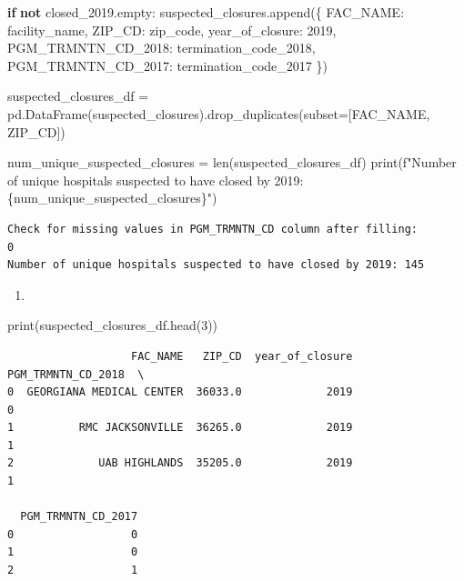 \documentclass[
  letterpaper,
  DIV=11,
  numbers=noendperiod]{scrartcl}
\newenvironment{Shaded}{\begin{snugshade}}{\end{snugshade}}
\newcommand{\BuiltInTok}[1]{\textcolor[rgb]{0.00,0.23,0.31}{#1}}
\newcommand{\ControlFlowTok}[1]{\textcolor[rgb]{0.00,0.23,0.31}{\textbf{#1}}}
\newcommand{\DecValTok}[1]{\textcolor[rgb]{0.68,0.00,0.00}{#1}}
\newcommand{\KeywordTok}[1]{\textcolor[rgb]{0.00,0.23,0.31}{\textbf{#1}}}
\newcommand{\NormalTok}[1]{\textcolor[rgb]{0.00,0.23,0.31}{#1}}
\newcommand{\OperatorTok}[1]{\textcolor[rgb]{0.37,0.37,0.37}{#1}}
\newcommand{\SpecialCharTok}[1]{\textcolor[rgb]{0.37,0.37,0.37}{#1}}
\newcommand{\SpecialStringTok}[1]{\textcolor[rgb]{0.13,0.47,0.30}{#1}}
\newcommand{\StringTok}[1]{\textcolor[rgb]{0.13,0.47,0.30}{#1}}
\providecommand{\tightlist}{%
  \setlength{\itemsep}{0pt}\setlength{\parskip}{0pt}}\usepackage{longtable,booktabs,array}
\begin{document}
\begin{Shaded}
\begin{Highlighting}[]
    \ControlFlowTok{if} \KeywordTok{not}\NormalTok{ closed\_2019.empty:}
\NormalTok{        suspected\_closures.append(\{}
            \StringTok{\textquotesingle{}FAC\_NAME\textquotesingle{}}\NormalTok{: facility\_name,}
            \StringTok{\textquotesingle{}ZIP\_CD\textquotesingle{}}\NormalTok{: zip\_code,}
            \StringTok{\textquotesingle{}year\_of\_closure\textquotesingle{}}\NormalTok{: }\DecValTok{2019}\NormalTok{,}
            \StringTok{\textquotesingle{}PGM\_TRMNTN\_CD\_2018\textquotesingle{}}\NormalTok{: termination\_code\_2018,}
            \StringTok{\textquotesingle{}PGM\_TRMNTN\_CD\_2017\textquotesingle{}}\NormalTok{: termination\_code\_2017}
\NormalTok{        \})}

\NormalTok{suspected\_closures\_df }\OperatorTok{=}\NormalTok{ pd.DataFrame(suspected\_closures).drop\_duplicates(subset}\OperatorTok{=}\NormalTok{[}\StringTok{\textquotesingle{}FAC\_NAME\textquotesingle{}}\NormalTok{, }\StringTok{\textquotesingle{}ZIP\_CD\textquotesingle{}}\NormalTok{])}

\NormalTok{num\_unique\_suspected\_closures }\OperatorTok{=} \BuiltInTok{len}\NormalTok{(suspected\_closures\_df)}
\BuiltInTok{print}\NormalTok{(}\SpecialStringTok{f"Number of unique hospitals suspected to have closed by 2019: }\SpecialCharTok{\{}\NormalTok{num\_unique\_suspected\_closures}\SpecialCharTok{\}}\SpecialStringTok{"}\NormalTok{)}
\end{Highlighting}
\end{Shaded}

\begin{verbatim}
Check for missing values in PGM_TRMNTN_CD column after filling:
0
Number of unique hospitals suspected to have closed by 2019: 145
\end{verbatim}

\begin{enumerate}
\def\labelenumi{\arabic{enumi}.}
\setcounter{enumi}{1}
\tightlist
\item
\end{enumerate}

\begin{Shaded}
\begin{Highlighting}[]
\BuiltInTok{print}\NormalTok{(suspected\_closures\_df.head(}\DecValTok{3}\NormalTok{))}
\end{Highlighting}
\end{Shaded}

\begin{verbatim}
                   FAC_NAME   ZIP_CD  year_of_closure PGM_TRMNTN_CD_2018  \
0  GEORGIANA MEDICAL CENTER  36033.0             2019                  0   
1          RMC JACKSONVILLE  36265.0             2019                  1   
2             UAB HIGHLANDS  35205.0             2019                  1   

  PGM_TRMNTN_CD_2017  
0                  0  
1                  0  
2                  1  
\end{verbatim}
\end{document}
